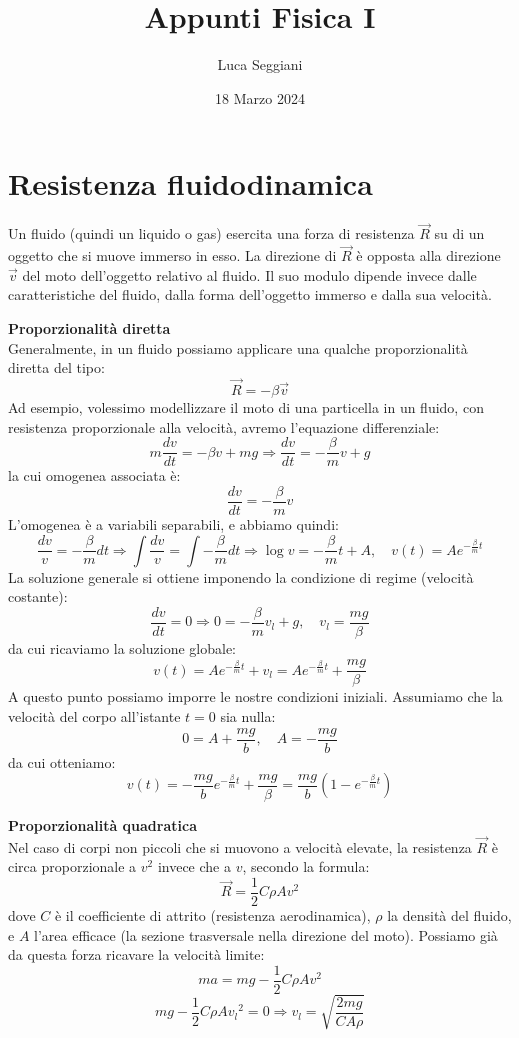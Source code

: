 \documentclass[a4paper,12pt]{article}
\title{Appunti Fisica I}
\author{Luca Seggiani}
\date{18 Marzo 2024}
\begin{document}
\maketitle
\section{Resistenza fluidodinamica}
Un fluido (quindi un liquido o gas) esercita una forza di resistenza $\vec{R}$ su di un oggetto che si muove immerso in esso.
La direzione di $\vec{R}$ è opposta alla direzione $\vec{v}$ del moto dell'oggetto relativo al fluido. Il suo modulo
dipende invece dalle caratteristiche del fluido, dalla forma dell'oggetto immerso e dalla sua velocità. 
\par\smallskip
\textbf{Proporzionalità diretta} \\
Generalmente, in un fluido possiamo applicare una qualche proporzionalità diretta del tipo:
$$ \vec{R} = -\beta\vec{v} $$
Ad esempio, volessimo modellizzare il moto di una particella in un fluido, con resistenza proporzionale alla velocità,
avremo l'equazione differenziale:
$$ m\frac{dv}{dt} = -\beta v+mg \Rightarrow \frac{dv}{dt} = -\frac{\beta}{m}v+g $$
la cui omogenea associata è:
$$ \frac{dv}{dt} = -\frac{\beta}{m}v $$
L'omogenea è a variabili separabili, e abbiamo quindi:
$$ \frac{dv}{v} = -\frac{\beta}{m}dt \Rightarrow \int{\frac{dv}{v}} = \int{-\frac{\beta}{m}dt} \Rightarrow \log{v} = -\frac{\beta}{m}t + A, \quad  v(t) = Ae^{-\frac{\beta}{m}t} $$
La soluzione generale si ottiene imponendo la condizione di regime (velocità costante):
$$ \frac{dv}{dt} = 0 \Rightarrow 0 = -\frac{\beta}{m}v_l + g, \quad v_l = \frac{mg}{\beta} $$
da cui ricaviamo la soluzione globale:
$$ v(t) = Ae^{-\frac{\beta}{m}t}+v_l = Ae^{-\frac{\beta}{m}t}+\frac{mg}{\beta} $$
A questo punto possiamo imporre le nostre condizioni iniziali. Assumiamo che la velocità del corpo all'istante $t=0$ sia nulla:
$$ 0 = A + \frac{mg}{b}, \quad A = -\frac{mg}{b} $$
da cui otteniamo:
$$ v(t) = -\frac{mg}{b} e^{-\frac{\beta}{m}t} + \frac{mg}{\beta} = \frac{mg}{b}(1-e^{-\frac{\beta}{m}t}) $$
\par\smallskip
\textbf{Proporzionalità quadratica} \\
Nel caso di corpi non piccoli che si muovono a velocità elevate, la resistenza $\vec{R}$ è circa proporzionale a $v^2$ invece che a $v$, secondo
la formula:
$$ \vec{R} = \frac{1}{2}C\rho Av^2$$
dove $C$ è il coefficiente di attrito (resistenza aerodinamica), $\rho$ la densità del fluido, e $A$ l'area efficace (la sezione trasversale nella
direzione del moto). Possiamo già da questa forza ricavare la velocità limite:
$$ ma = mg - \frac{1}{2}C\rho Av^2 $$
$$ mg - \frac{1}{2}C\rho A{v_l}^2 = 0 \Rightarrow v_l = \sqrt{\frac{2mg}{CA\rho}}$$
\end{document}
